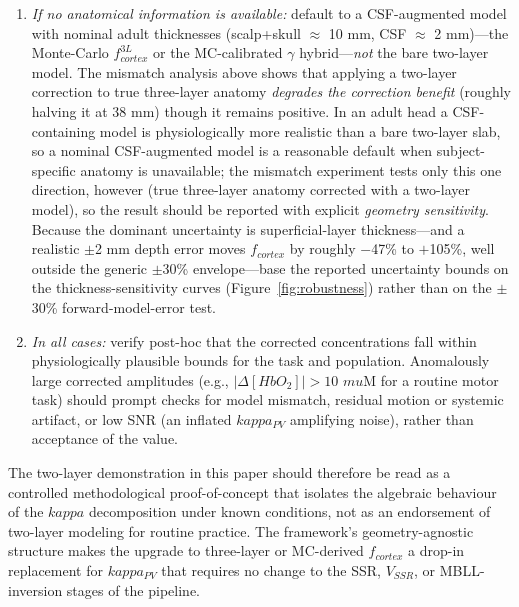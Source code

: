\documentclass[11pt]{article}
\def\kappa{kappa}%
\def\mu{mu}%
\def\mathrm#1{#1}%
\def\,{ }%
\begin{document}
\begin{enumerate}
\item \textit{If no anatomical information is available:} default to a CSF-augmented model with nominal adult thicknesses (scalp+skull $\approx$ 10\,mm, CSF $\approx$ 2\,mm)---the Monte-Carlo $f_{\mathrm{cortex}}^{\mathrm{3L}}$ or the MC-calibrated $\gamma$ hybrid---\emph{not} the bare two-layer model. The mismatch analysis above shows that applying a two-layer correction to true three-layer anatomy \emph{degrades the correction benefit} (roughly halving it at 38\,mm) though it remains positive. In an adult head a CSF-containing model is physiologically more realistic than a bare two-layer slab, so a nominal CSF-augmented model is a reasonable default when subject-specific anatomy is unavailable; the mismatch experiment tests only this one direction, however (true three-layer anatomy corrected with a two-layer model), so the result should be reported with explicit \emph{geometry sensitivity}. Because the dominant uncertainty is superficial-layer thickness---and a realistic $\pm$2\,mm depth error moves $f_{\mathrm{cortex}}$ by roughly $-$47\% to $+$105\%, well outside the generic $\pm$30\% envelope---base the reported uncertainty bounds on the thickness-sensitivity curves (Figure~\ref{fig:robustness}) rather than on the $\pm$30\% forward-model-error test.
\item \textit{In all cases:} verify post-hoc that the corrected concentrations fall within physiologically plausible bounds for the task and population. Anomalously large corrected amplitudes (e.g., $|\Delta[\mathrm{HbO}_2]| > 10$\,$\mu$M for a routine motor task) should prompt checks for model mismatch, residual motion or systemic artifact, or low SNR (an inflated $\kappa_{\mathrm{PV}}$ amplifying noise), rather than acceptance of the value.
\end{enumerate}

The two-layer demonstration in this paper should therefore be read as a controlled methodological proof-of-concept that isolates the algebraic behaviour of the $\kappa$ decomposition under known conditions, not as an endorsement of two-layer modeling for routine practice. The framework's geometry-agnostic structure makes the upgrade to three-layer or MC-derived $f_{\mathrm{cortex}}$ a drop-in replacement for $\kappa_{\mathrm{PV}}$ that requires no change to the SSR, $V_{\mathrm{SSR}}$, or MBLL-inversion stages of the pipeline.
\end{document}
